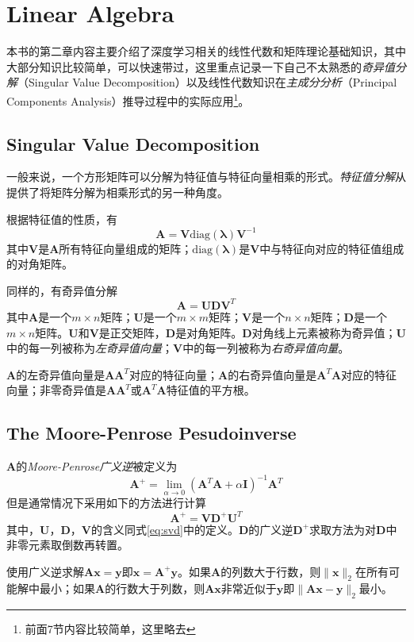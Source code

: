 \chapter{Linear Algebra}

本书的第二章内容主要介绍了深度学习相关的线性代数和矩阵理论基础知识，其中大部分知识比较简单，可以快速带过，这里重点记录一下自己不太熟悉的\textit{奇异值分解}（Singular Value Decomposition）以及线性代数知识在\textit{主成分分析}（Principal Components Analysis）推导过程中的实际应用\footnote{前面7节内容比较简单，这里略去}。

\setcounter{section}{7}
\section{Singular Value Decomposition}

一般来说，一个方形矩阵可以分解为特征值与特征向量相乘的形式。\textit{特征值分解}从提供了将矩阵分解为相乘形式的另一种角度。

根据特征值的性质，有
\begin{equation}
\bm A = \bm V\text{diag}(\bm\lambda)\bm V^{-1}
\end{equation}
其中$\bm V$是$\bm A$所有特征向量组成的矩阵；$\text{diag}(\bm\lambda)$是$\bm V$中与特征向对应的特征值组成的对角矩阵。

同样的，有奇异值分解
\begin{equation}\label{eq:svd}
\bm A=\bm{UDV}^{T}
\end{equation}
其中$\bm A$是一个$m\times n$矩阵；$\bm U$是一个$m\times m$矩阵；$\bm V$是一个$n\times n$矩阵；$\bm D$是一个$m\times n$矩阵。$\bm U$和$\bm V$是正交矩阵，$\bm D$是对角矩阵。$\bm D$对角线上元素被称为奇异值；$\bm U$中的每一列被称为\textit{左奇异值向量}；$\bm V$中的每一列被称为\textit{右奇异值向量}。

$\bm A$的左奇异值向量是$\bm {AA}^T$对应的特征向量；$\bm A$的右奇异值向量是$\bm{A}^T\bm A$对应的特征向量；非零奇异值是$\bm {AA}^T$或$\bm{A}^T\bm A$特征值的平方根。

\section{The Moore-Penrose Pesudoinverse}

$\bm A$的\textit{Moore-Penrose广义逆}被定义为
\begin{equation}
\bm A^+=\lim_{\alpha\to 0}(\bm{A}^T\bm A+\alpha\bm I)^{-1}\bm A^T
\end{equation}
但是通常情况下采用如下的方法进行计算
\begin{equation}
\bm A^+=\bm{VD}^+\bm U^T
\end{equation}
其中，$\bm{U}$，$\bm{D}$，$\bm{V}$的含义同式\ref{eq:svd}中的定义。$\bm D$的广义逆$\bm D^+$求取方法为对$\bm D$中非零元素取倒数再转置。

使用广义逆求解$\bm {Ax=y}$即$\bm{x=A^+y}$。如果$\bm A$的列数大于行数，则$\|\bm x\|_2$在所有可能解中最小；如果$\bm A$的行数大于列数，则$\bm{Ax}$非常近似于$\bm y$即$\|\bm{Ax-y}\|_2$最小。